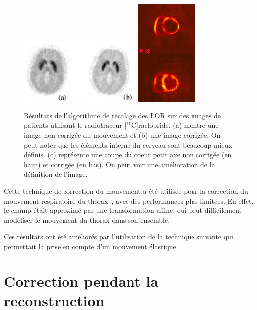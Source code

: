 \begin{figure}[h!]
	\begin{center}
		\includegraphics[width=6cm]{images/bloomfield2003design} \includegraphics[width=3cm]{images/livieratos2005rigid}
	\end{center}
	\caption{Résultats de l'algorithme de recalage des LOR sur des images de patients utilisant le radiotraceur [$^{11}$C]raclopride. (a) montre une image non corrigée du mouvement et (b) une image corrigée. On peut noter que les éléments interne du cerveau sont beaucoup mieux définis. (c) représente une coupe du coeur petit axe non corrigée (en haut) et corrigée (en bas). On peut voir une amélioration de la définition de l'image.} 
	\label{fig:ameliorationLOR}
\end{figure}

Cette technique de correction du mouvement a été utilisée pour la correction du mouvement respiratoire du thorax~\cite{lamare2007respiratory,lamare2007list}, avec des performances plus limitées. En effet, le champ était approximé par une transformation affine, qui peut difficilement modéliser le mouvement du thorax dans son ensemble.

Ces résultats ont été améliorés par l'utilisation de la technique suivante qui permettait la prise en compte d'un mouvement élastique.

\section{Correction pendant la reconstruction}


